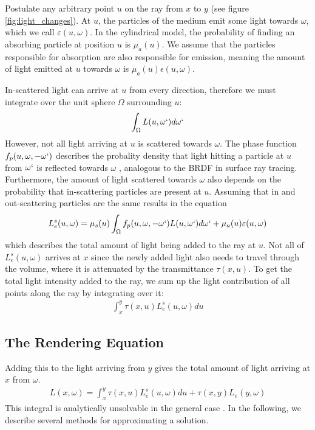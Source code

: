 Postulate any arbitrary point ${u}$ on the ray from ${x}$ to ${y}$ (see figure \ref{fig:light_changes}).
At ${u}$, the particles of the medium emit some light towards $\omega$\cite{468400}, which we call $\varepsilon ({u}, \omega )$. In the cylindrical model, the probability of finding an absorbing particle at position ${u}$ is ${\mu}_a({u})$. We assume that the particles responsible for absorption are also responsible for emission\cite{468400}, meaning the amount of light emitted at ${u}$ towards $\omega$ is ${\mu}_a({u})\epsilon ({u}, \omega )$.

In-scattered light can arrive at ${u}$ from every direction, therefore we must integrate over the unit sphere $\Omega$ surrounding ${u}$\cite{10.1145/280814.280925}:
\begin{align*}
\int_{\Omega} L({u}, \omega `)d\omega `
\end{align*}
However, not all light arriving at ${u}$ is scattered towards $\omega $. The phase function $f_p({u}, \omega , -\omega `)$ describes the probality density \cite{wiki:Probability_density_function} that light hitting a particle at ${u}$ from $\omega `$ is reflected towards $\omega$ \cite{10.1145/280814.280925, Cerezo2005}, analogous to the BRDF \cite{10.1145/965141.563893} in surface ray tracing. Furthermore, the amount of light scattered towards $\omega $ also depends on the probability that in-scattering particles are present at ${u}$\cite{10.1145/280814.280925}. Assuming that in and out-scattering particles are the same results in the equation
\begin{align*}
L_e^s({u}, \omega ) = {\mu}_s({u})\int_{\Omega} f_p({u}, \omega , -\omega `)L({u}, \omega `)d\omega `  + {\mu}_a({u})\varepsilon ({u}, \omega )
\end{align*}
which describes the total amount of light being added to the ray at ${u}$.
Not all of $L_e^s({u}, \omega )$ arrives at ${x}$ since the newly added light also needs to travel through the volume, where it is attenuated by the transmittance $\tau ({x}, {u})$.
To get the total light intensity added to the ray, we sum up the light contribution of all points along the ray by integrating over it\cite{zhou2007real-time}:
\begin{align*}
\int_{{x}}^{{y}} \tau({x}, {u})L_e^s({u}, \omega )d{u}
\end{align*}
\subsection{The Rendering Equation}
Adding this to the light arriving from ${y}$ gives the total amount of light arriving at ${x}$ from $\omega $.
\begin{align*}
L({x}, \omega ) = {\int_{{x}}^{{y}} \tau({x}, {u})L_e^s({u}, \omega )d{u}} + \tau({x}, {y}) L_e({y}, \omega )
\end{align*}
This integral is analytically unsolvable in the general case \cite{10.1145/964965.808594}.
In the following, we describe several methods for approximating a solution.











